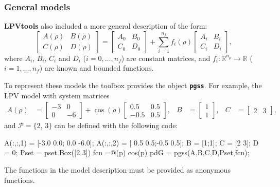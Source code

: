 \documentclass[fleqn,11pt]{article}
\newcommand{\lcode}[1]{\textbf{%
    \lstinline[style=mystyle]{#1}}}
\newcommand{\p}{\rho}
\newcommand{\Rset}{\mathbb{R}}
\newcommand{\Pset}{\mathcal{P}}
\newcommand{\lpvtool}{\textbf{LPVtools}\xspace}
\begin{document}
\subsubsection{General models}\label{sssec:sysPgss}

\lpvtool also included a more general description of the form:
\begin{equation}\label{eq:gralLPVmodel}
    \begin{bmatrix}
        A(\p) & B(\p) \\
        C(\p) & D(\p)
    \end{bmatrix} =
    \begin{bmatrix}
        A_0 & B_0 \\
        C_0 & D_0
    \end{bmatrix} + \sum_{i=1}^{n_f}f_i(\p)
    \begin{bmatrix}
        A_i & B_i \\
        C_i & D_i
    \end{bmatrix},
\end{equation}
where $A_i$, $B_i$, $C_i$ and $D_i$ ($i=0,\dots,n_f$) are constant matrices, and $f_i:\Rset^{n_p}\to\Rset$ ($i=1,\dots,n_f$) are known and bounded functions.

To represent these models the toolbox provides the object \lcode{pgss}. For example, the LPV model with system matrices
\begin{align*}
    A(\p) &= \begin{bmatrix}
                -3 & 0 \\
                 0 & -6
            \end{bmatrix} + \cos(\p)
            \begin{bmatrix}
                0.5 & 0.5 \\
               -0.5 & 0.5
            \end{bmatrix},&
    B &= \begin{bmatrix}
          1 \\ 1
        \end{bmatrix},&
    C &= \begin{bmatrix}
          2 & 3
        \end{bmatrix},
\end{align*}
and $\Pset=\{2,\,3\}$ can be defined with the following code:
\begin{code}
A(:,:,1) = [-3.0 0.0; 0.0 -6.0];
A(:,:,2) = [ 0.5 0.5;-0.5  0.5];
B        = [1;1];
C        = [2 3];
D        = 0;
Pset = pset.Box([2 3])
fcn  =@(p) cos(p)
pdG = pgss(A,B,C,D,Pset,fcn);
\end{code}
The functions in the model description must be provided as anonymous functions.
\end{document}
